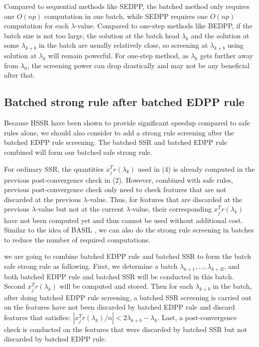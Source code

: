 \documentclass{article}
\begin{document}
Compared to sequential methods like SEDPP, the batched method only requires one $O(np)$ computation in one batch, while SEDPP requires one $O(np)$ computation for each $\lambda$-value. Compared to one-step methods like BEDPP, if the batch size is not too large, the solution at the batch head $\lambda_k$ and the solution at some $\lambda_{k+b}$ in the batch are usually relatively close, so screening at $\lambda_{k+b}$ using solution at $\lambda_k$ will remain powerful. For one-step method, as $\lambda_k$ gets further away from $\lambda_0$, the screening power can drop drastically and
may not be any beneficial after that.

\subsection{Batched strong rule after batched EDPP rule}

Because HSSR \cite{zeng2017efficient} have been shown to provide significant speedup compared to safe rules alone, we should also consider to add a strong rule screening after the batched EDPP rule screening. The batched SSR and batched EDPP rule combined will form our batched safe strong rule.

For ordinary SSR, the quantities $x_j^Tr(\lambda_k)$ used in (4) is already computed in the previous post-convergence check in (2). However, combined with safe rules, previous post-convergence check only need to check features that are not discarded at the previous $\lambda$-value. Thus, for features that are discarded at the previous $\lambda$-value but not at the current $\lambda$-value, their corresponding $x_j^Tr(\lambda_k)$ have not been computed yet and thus cannot be used without additional cost. Similar to the idea of BASIL \cite{qian2019fast}, we can also do the strong rule screening in batches to reduce the number of required computations.

we are going to combine batched EDPP rule and batched SSR to form the batch safe strong rule as following. First, we determine a batch $\lambda_{k+1},...,\lambda_{k+B}$, and both batched EDPP rule and batched SSR will be conducted in this batch. Second $x_j^Tr(\lambda_k)$ will be computed and stored. Then for each $\lambda_{k+b}$ in the batch, after doing batched EDPP rule screening, a batched SSR screening is carried out on the features have not been discarded by batched EDPP rule and discard features that satisfies: $|x_j^Tr(\lambda_k)/n|<2\lambda_{k+b}-\lambda_k$. Last, a post-convergence check is conducted on the features that were discarded by batched SSR but not discarded by batched EDPP rule.
\end{document}
